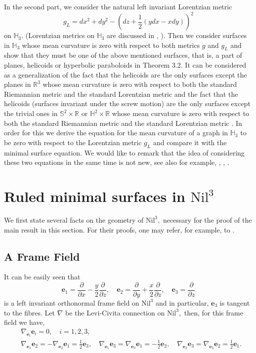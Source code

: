 \documentclass[11pt]{amsart}
\begin{document}
In the second part, we consider the natural left invariant
Lorentzian metric
$$
g_L=dx^2+dy^2-\left(dz+\frac12(ydx-xdy)\right)^2
$$
on ${\mathbb{H}}_3.$ (Lorentzian metrics on ${\mathbb{H}}_3$ are discussed in
\cite{R}, \cite{RR}). Then we consider surfaces in ${\mathbb{H}}_3$ whose
mean curvature is zero with respect to both metrics $g$ and $g_L$
and show that they must be one of the above mentioned surfaces,
that is, a part of planes, helicoids or hyperbolic paraboloids in
Theorem 3.2. It can be considered as a generalization of the fact
that the helicoids are the only surfaces except the planes in
${\mathbb{R}}^3$ whose mean curvature is zero with respect to both the
standard Riemannian metric and the standard Lorentzian metric
\cite{K} and the fact that the helicoids (surfaces invariant under
the screw motion) are the only surfaces except the trivial ones in
${\mathbb{S}}^2\times{\mathbb{R}}$ or ${\mathbb{H}}^2\times{\mathbb{R}}$ whose mean curvature is
zero with respect to both the standard Riemannian metric and the
standard Lorentzian metric \cite{KKSY}. In order for this we
derive the equation for the mean curvature of a graph in ${\mathbb{H}}_3$
to be zero with respect to the Lorentzian metric $g_L$ and compare
it with the minimal surface equation. We would like to remark that
the idea of considering these two equations in the same time is
not new, see also for example, \cite{AA}, \cite{AB}, \cite{K}.

\section{Ruled minimal surfaces in $\text{Nil}^3$}

 We first state several facts on the geometry of
$\text{Nil}^3,$ necessary for the proof of the main result in this
section. For their proofs, one may refer, for example, to
\cite{IKOS}.

\subsection{A Frame Field} It can be easily seen that
$$
{\mathbf{e}}_1=\frac{\partial}{\partial
x}-\frac{y}2\frac{\partial}{\partial z},\quad
{\mathbf{e}}_2=\frac{\partial}{\partial
y}+\frac{x}2\frac{\partial}{\partial z},\quad
{\mathbf{e}}_3=\frac{\partial}{\partial z}
$$
is a left invariant orthonormal frame field on $\text{Nil}^3$ and
in particular, ${\mathbf{e}}_3$ is tangent to the fibres. Let $\nabla$ be
the Levi-Civita connection on $\text{Nil}^3,$ then, for this frame
field we have,
\[
\begin{split}
& \nabla_{{\mathbf{e}}_i}{\mathbf{e}}_i=0,\quad i=1,2,3,\\
& \nabla_{{\mathbf{e}}_1}{\mathbf{e}}_2=
-\nabla_{{\mathbf{e}}_2}{\mathbf{e}}_1=\frac12{\mathbf{e}}_3,\quad \nabla_{{\mathbf{e}}_1}{\mathbf{e}}_3=
\nabla_{{\mathbf{e}}_3}{\mathbf{e}}_1=-\frac12{\mathbf{e}}_2,\quad \nabla_{{\mathbf{e}}_2}{\mathbf{e}}_3=
\nabla_{{\mathbf{e}}_3}{\mathbf{e}}_2=\frac12{\mathbf{e}}_1.
\end{split}
\]
\end{document}
